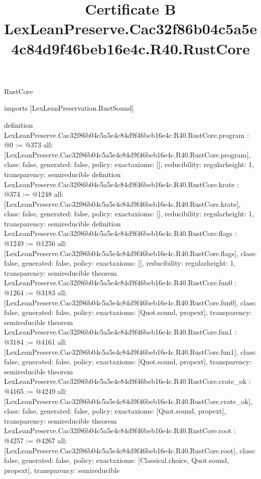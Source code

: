\begin{lexlean}{RustCore}
\title{Certificate B LexLeanPreserve.Cac32f86b04c5a5e4c84d9f46beb16e4c.R40.RustCore}
\begin{coremodule}
imports [LexLeanPreservation.RustSound]

definition LexLeanPreserve.Cac32f86b04c5a5e4c84d9f46beb16e4c.R40.RustCore.program : @0 := @373 {
  all: [LexLeanPreserve.Cac32f86b04c5a5e4c84d9f46beb16e4c.R40.RustCore.program],
  class: false,
  generated: false,
  policy: exact{axioms: []},
  reducibility: regular{height: 1},
  transparency: semireducible
}
definition LexLeanPreserve.Cac32f86b04c5a5e4c84d9f46beb16e4c.R40.RustCore.krate : @374 := @1248 {
  all: [LexLeanPreserve.Cac32f86b04c5a5e4c84d9f46beb16e4c.R40.RustCore.krate],
  class: false,
  generated: false,
  policy: exact{axioms: []},
  reducibility: regular{height: 1},
  transparency: semireducible
}
definition LexLeanPreserve.Cac32f86b04c5a5e4c84d9f46beb16e4c.R40.RustCore.flags : @1249 := @1256 {
  all: [LexLeanPreserve.Cac32f86b04c5a5e4c84d9f46beb16e4c.R40.RustCore.flags],
  class: false,
  generated: false,
  policy: exact{axioms: []},
  reducibility: regular{height: 1},
  transparency: semireducible
}
theorem LexLeanPreserve.Cac32f86b04c5a5e4c84d9f46beb16e4c.R40.RustCore.fun0 : @1264 := @3183 {
  all: [LexLeanPreserve.Cac32f86b04c5a5e4c84d9f46beb16e4c.R40.RustCore.fun0],
  class: false,
  generated: false,
  policy: exact{axioms: [Quot.sound, propext]},
  transparency: semireducible
}
theorem LexLeanPreserve.Cac32f86b04c5a5e4c84d9f46beb16e4c.R40.RustCore.fun1 : @3184 := @4161 {
  all: [LexLeanPreserve.Cac32f86b04c5a5e4c84d9f46beb16e4c.R40.RustCore.fun1],
  class: false,
  generated: false,
  policy: exact{axioms: [Quot.sound, propext]},
  transparency: semireducible
}
theorem LexLeanPreserve.Cac32f86b04c5a5e4c84d9f46beb16e4c.R40.RustCore.crate_ok : @4165 := @4249 {
  all: [LexLeanPreserve.Cac32f86b04c5a5e4c84d9f46beb16e4c.R40.RustCore.crate_ok],
  class: false,
  generated: false,
  policy: exact{axioms: [Quot.sound, propext]},
  transparency: semireducible
}
theorem LexLeanPreserve.Cac32f86b04c5a5e4c84d9f46beb16e4c.R40.RustCore.root : @4257 := @4267 {
  all: [LexLeanPreserve.Cac32f86b04c5a5e4c84d9f46beb16e4c.R40.RustCore.root],
  class: false,
  generated: false,
  policy: exact{axioms: [Classical.choice, Quot.sound, propext]},
  transparency: semireducible
}


\end{coremodule}
\end{lexlean}
